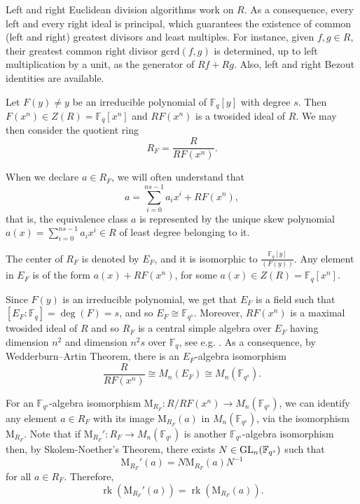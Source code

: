 \documentclass[a4paper, 11pt]{article}
\DeclareMathOperator{\rk}{rk}
\newcommand{\F}{{\mathbb F}}
\newcommand{\GL}{\hbox{{\rm GL}}}
\newcommand{\fq}{{\mathbb F}_{q}}
\newcommand{\gcrd}{\mathrm{gcrd}}
\newcommand{\M}{\mathrm{M}}
\begin{document}
Left and right Euclidean division algorithms work on \(R\). As a consequence, every left and every right ideal is principal, which guarantees the existence of common (left and right) greatest divisors and least  multiples.  For instance, given \(f, g \in R\), their greatest  common right divisor \(\gcrd(f,g)\) is determined, up to left multiplication by a unit, as the generator of \(Rf + Rg\).  Also, left and right Bezout identities are available. 


Let $F(y) \neq y$ be an irreducible polynomial of $\F_q[y]$ with degree $s$. Then $F(x^n)\in Z(R)=\F_q[x^n]$ and \(RF(x^n)\) is a twosided ideal of \(R\). We may then consider the quotient ring
\[ R_F=\frac{R}{RF(x^n)}. 
\]

When we declare \(a \in R_F\), we will often understand that
\[
a = \sum_{i=0}^{ns-1}a_ix^i + RF(x^n),
\]
that is, the equivalence class \(a\) is represented by the unique skew polynomial \(a(x) = \sum_{i=0}^{ns-1}a_ix^i \in R\) of least degree belonging to it. 

The center of $R_F$ is denoted by 
\(E_F\), and it is isomorphic to  \(\frac{\fq[y]}{(F(y))}\). 
Any element in $E_F$ is of the form $a(x)+RF(x^n)$, for some $a(x) \in Z(R) = \F_q[x^n]$. 



Since $F(y)$ is an irreducible polynomial, we get that  $E_F$ is a field such that $[E_F:\F_q]=\deg(F)=s$, and so $E_F \cong \F_{q^s}$. Moreover, $RF(x^n)$ is a maximal twosided ideal of $R$ and so $R_F$ is a central simple algebra over $E_F$ having dimension $n^2$ and dimension $n^2s$ over $\F_q$, see e.g. \cite{gomez2019computing}. As a consequence, by Wedderburn–Artin Theorem, there is an $E_F$-algebra isomorphism
\begin{equation} \label{eq:artin}
    \frac{R}{RF(x^n)} \cong M_n(E_F) \cong M_n(\F_{q^s}). 
\end{equation}



For an $\F_{q^s}$-algebra isomorphism $\M_{R_F}:R/RF(x^n) \rightarrow M_n(\F_{q^s})$, we can identify any element $a \in R_F$ with its image $\M_{R_F}(a)$ in $M_n(\F_{q^s})$, via the isomorphism $\M_{R_F}$. Note that if $\M_{R_F}': R_F \rightarrow M_n(\F_{q^s})$ is another $\F_{q^s}$-algebra isomorphism then, by Skolem-Noether's Theorem, there exists \( N \in \GL_n(\F_{q^s}) \) such that
\[
\M_{R_F}'(a) = N \M_{R_F}(a) N^{-1}
\]
for all \( a \in R_F \). Therefore,
\begin{equation} \label{eq:invariance} \rk(\M_{R_F}'(a)) = \rk(\M_{R_F}(a)). \end{equation}
\end{document}
